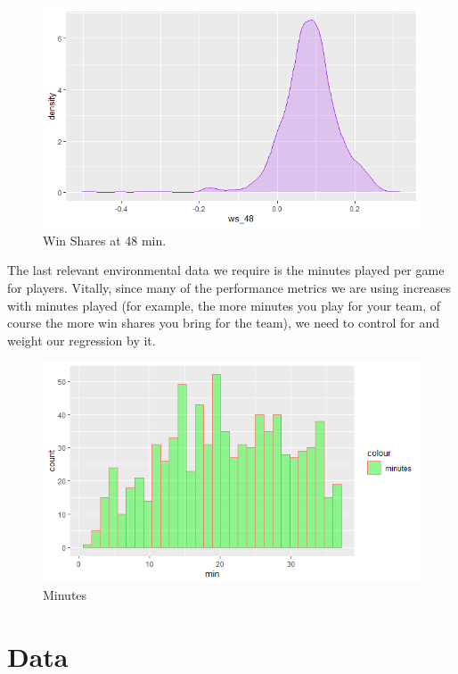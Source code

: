 \documentclass[12pt]{article}
\begin{document}
	\begin{figure}[H]
		\centering
		\includegraphics[width=\textwidth]{ws_48.png}
		\caption{Win Shares at 48 min.}
		\label{fig:Win Shares at 48 min.}
	\end{figure}
	
	The last relevant environmental data we require is the minutes played per game for players. Vitally, since many of the performance metrics we are using increases with minutes played (for example, the more minutes you play for your team, of course the more win shares you bring for the team), we need to control for and weight our regression by it.	
	
	\begin{figure}[H]
		\centering
		\includegraphics[width=\textwidth]{min.png}
		\caption{Minutes}
		\label{fig:Minutes}
	\end{figure}
	
	\section{Data} \label{sec:data}
	
\end{document}
